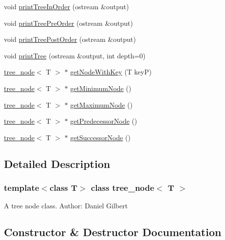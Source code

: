 \begin{DoxyCompactItemize}
\item 
void \hyperlink{classtree__node_a06d05cc3d2201be12bbeea10190a923f}{print\+Tree\+In\+Order} (ostream \&output)
\item 
void \hyperlink{classtree__node_af6b781b7c54d6ffa8fc3d8ddb15a184d}{print\+Tree\+Pre\+Order} (ostream \&output)
\item 
void \hyperlink{classtree__node_a7a30637fff22c441f95e9e1b7cb34649}{print\+Tree\+Post\+Order} (ostream \&output)
\item 
void \hyperlink{classtree__node_a241608f3e979085651ccc8e77c816b58}{print\+Tree} (ostream \&output, int depth=0)
\item 
\hyperlink{classtree__node}{tree\+\_\+node}$<$ T $>$ $\ast$ \hyperlink{classtree__node_a7216e66159b013b47e259555416ec72f}{get\+Node\+With\+Key} (T keyP)
\item 
\hyperlink{classtree__node}{tree\+\_\+node}$<$ T $>$ $\ast$ \hyperlink{classtree__node_afde196c44a09ac3fe97347d31540ea93}{get\+Minimum\+Node} ()
\item 
\hyperlink{classtree__node}{tree\+\_\+node}$<$ T $>$ $\ast$ \hyperlink{classtree__node_a70bdade8011a6a46b083ea680fcea52f}{get\+Maximum\+Node} ()
\item 
\hyperlink{classtree__node}{tree\+\_\+node}$<$ T $>$ $\ast$ \hyperlink{classtree__node_a5cce6c37b00a6d899e371c334559310e}{get\+Predecessor\+Node} ()
\item 
\hyperlink{classtree__node}{tree\+\_\+node}$<$ T $>$ $\ast$ \hyperlink{classtree__node_a666b33dc3b2f3e2d2e4815cc4ec8b131}{get\+Successor\+Node} ()
\end{DoxyCompactItemize}


\subsection{Detailed Description}
\subsubsection*{template$<$class T$>$\newline
class tree\+\_\+node$<$ T $>$}

A tree node class. Author\+: Daniel Gilbert 

\subsection{Constructor \& Destructor Documentation}
\mbox{\label{classtree__node_a776da4de6a1faef8b984f8b6dfe6eb6a}} 
